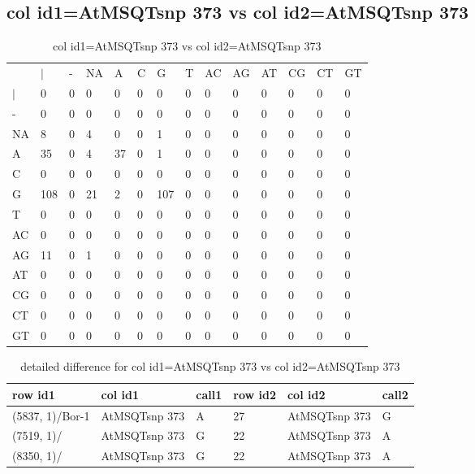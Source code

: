 \subsection{col id1=AtMSQTsnp 373 vs col id2=AtMSQTsnp 373}
\begin{center}
\begin{longtable}{|l|l|l|l|l|l|l|l|l|l|l|l|l|l|}
\caption{col id1=AtMSQTsnp 373 vs col id2=AtMSQTsnp 373} \label{table_dm886}\\
\hline
\\
\hline
&$|$&-&NA&A&C&G&T&AC&AG&AT&CG&CT&GT\\
$|$&0&0&0&0&0&0&0&0&0&0&0&0&0\\
-&0&0&0&0&0&0&0&0&0&0&0&0&0\\
NA&8&0&4&0&0&1&0&0&0&0&0&0&0\\
A&35&0&4&37&0&1&0&0&0&0&0&0&0\\
C&0&0&0&0&0&0&0&0&0&0&0&0&0\\
G&108&0&21&2&0&107&0&0&0&0&0&0&0\\
T&0&0&0&0&0&0&0&0&0&0&0&0&0\\
AC&0&0&0&0&0&0&0&0&0&0&0&0&0\\
AG&11&0&1&0&0&0&0&0&0&0&0&0&0\\
AT&0&0&0&0&0&0&0&0&0&0&0&0&0\\
CG&0&0&0&0&0&0&0&0&0&0&0&0&0\\
CT&0&0&0&0&0&0&0&0&0&0&0&0&0\\
GT&0&0&0&0&0&0&0&0&0&0&0&0&0\\
\hline
\end{longtable}
\end{center}

\begin{center}
\begin{longtable}{|l|l|l|l|l|l|}
\caption{detailed difference for col id1=AtMSQTsnp 373 vs col id2=AtMSQTsnp 373} \label{table_dm887}\\
\hline
row id1&col id1&call1&row id2&col id2&call2\\
\hline
(5837, 1)/Bor-1&AtMSQTsnp 373&A&27&AtMSQTsnp 373&G\\
(7519, 1)/&AtMSQTsnp 373&G&22&AtMSQTsnp 373&A\\
(8350, 1)/&AtMSQTsnp 373&G&22&AtMSQTsnp 373&A\\
\hline
\end{longtable}
\end{center}

